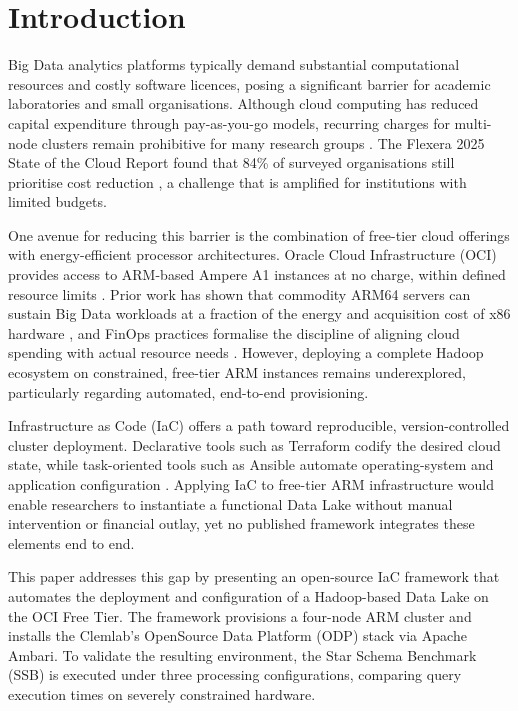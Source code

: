 \section{Introduction}
\label{sec:introduction}

Big Data analytics platforms typically demand substantial computational resources and
costly software licences, posing a significant barrier for academic laboratories and
small organisations. Although cloud computing has reduced capital expenditure through
pay-as-you-go models, recurring charges for multi-node clusters remain prohibitive for
many research groups \citep{deochake2026cloudaiinfrastructurecost}. The Flexera 2025 State
of the Cloud Report found that 84\% of surveyed organisations still prioritise cost
reduction \citep{flexera2025stateofcloud}, a challenge that is amplified for institutions
with limited budgets.

One avenue for reducing this barrier is the combination of free-tier cloud offerings with
energy-efficient processor architectures. Oracle Cloud Infrastructure (OCI) provides
 access to ARM-based Ampere A1 instances at no charge, within defined resource
limits \citep{oci_docs}. Prior work has shown that commodity ARM64 servers can sustain Big
Data workloads at a fraction of the energy and acquisition cost of x86 hardware
\citep{8287751, loghin2015performance}, and FinOps practices formalise the discipline of
aligning cloud spending with actual resource needs \citep{vo2025finopsagentusecase}.
However, deploying a complete Hadoop ecosystem on constrained, free-tier ARM instances
remains underexplored, particularly regarding automated, end-to-end provisioning.

Infrastructure as Code (IaC) offers a path toward reproducible, version-controlled
cluster deployment. Declarative tools such as Terraform codify the desired cloud state,
while task-oriented tools such as Ansible automate operating-system and application
configuration \citep{morris2016infrastructure, Bollineni2022IaCDataEngineering}. Applying
IaC to free-tier ARM infrastructure would enable researchers to instantiate a functional
Data Lake without manual intervention or financial outlay, yet no published framework
integrates these elements end to end.

This paper addresses this gap by presenting an open-source IaC framework that automates
the deployment and configuration of a Hadoop-based Data Lake on the OCI Free Tier. The
framework provisions a four-node ARM cluster and installs the Clemlab's OpenSource Data Platform
(ODP) stack via Apache Ambari. To validate the resulting environment, the Star Schema
Benchmark (SSB) \citep{oneil2009star} is executed under three processing configurations, comparing query
execution times on severely constrained hardware.


